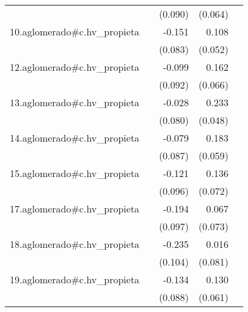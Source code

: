 {\begin{longtable}{l*{4}{D{.}{.}{-1}}}
            &                     &     (0.090)         &     (0.064)         &                     \\
\addlinespace
10.aglomerado#c.hv\_propieta&                     &      -0.151         &       0.108\sym{*}  &                     \\
            &                     &     (0.083)         &     (0.052)         &                     \\
\addlinespace
12.aglomerado#c.hv\_propieta&                     &      -0.099         &       0.162\sym{*}  &                     \\
            &                     &     (0.092)         &     (0.066)         &                     \\
\addlinespace
13.aglomerado#c.hv\_propieta&                     &      -0.028         &       0.233\sym{***}&                     \\
            &                     &     (0.080)         &     (0.048)         &                     \\
\addlinespace
14.aglomerado#c.hv\_propieta&                     &      -0.079         &       0.183\sym{**} &                     \\
            &                     &     (0.087)         &     (0.059)         &                     \\
\addlinespace
15.aglomerado#c.hv\_propieta&                     &      -0.121         &       0.136         &                     \\
            &                     &     (0.096)         &     (0.072)         &                     \\
\addlinespace
17.aglomerado#c.hv\_propieta&                     &      -0.194\sym{*}  &       0.067         &                     \\
            &                     &     (0.097)         &     (0.073)         &                     \\
\addlinespace
18.aglomerado#c.hv\_propieta&                     &      -0.235\sym{*}  &       0.016         &                     \\
            &                     &     (0.104)         &     (0.081)         &                     \\
\addlinespace
19.aglomerado#c.hv\_propieta&                     &      -0.134         &       0.130\sym{*}  &                     \\
            &                     &     (0.088)         &     (0.061)         &                     \\

\end{longtable}}
